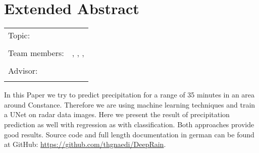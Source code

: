 \chapter*{Extended Abstract}

\begin{center}
	\begingroup
	\renewcommand*{\arraystretch}{1}
	{\makeatletter	
		\begin{tabular}{p{3.2cm}p{9.6cm}}
			Topic: & \thema \\
			& \\
			Team members: & \verfasserA, \verfasserB, \verfasserC, \verfasserD \\
			& \\
			Advisor: & \hoschschule \newline \institut \newline \prueferA \\
			& \\
		\end{tabular}
		
		\makeatother}
	\endgroup
\end{center}

\bigskip

In this Paper we try to predict precipitation for a range of 35 minutes in an area around Constance.
Therefore we are using machine learning techniques and train a UNet on radar data images. 
Here we present the result of precipitation prediction as well with regression as with classification. 
Both approaches provide good results. Source code and full length documentation in german can be found at GitHub: \url{https://github.com/thgnaedi/DeepRain}.


\printbibliography[title={Referenzen}, heading=subbibliography]

